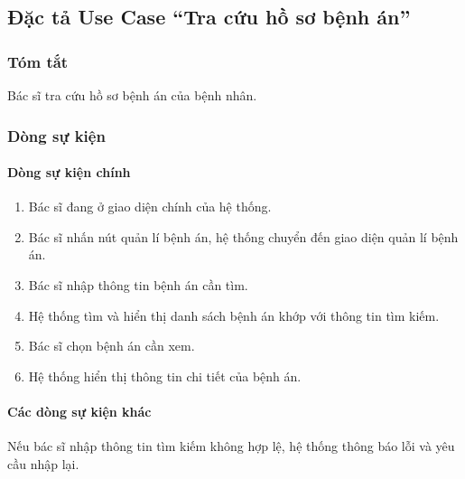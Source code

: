 \subsection{Đặc tả Use Case ``Tra cứu hồ sơ bệnh án''}

\subsubsection{Tóm tắt}
Bác sĩ tra cứu hồ sơ bệnh án của bệnh nhân.

\subsubsection{Dòng sự kiện}
\paragraph{\textbf{Dòng sự kiện chính}}
\begin{enumerate}
  \item Bác sĩ đang ở giao diện chính của hệ thống.
  \item Bác sĩ nhấn nút quản lí bệnh án, hệ thống chuyển đến giao diện quản lí bệnh án.
  \item Bác sĩ nhập thông tin bệnh án cần tìm.
  \item Hệ thống tìm và hiển thị danh sách bệnh án khớp với thông tin tìm kiếm.
  \item Bác sĩ chọn bệnh án cần xem.
  \item Hệ thống hiển thị thông tin chi tiết của bệnh án.
\end{enumerate}

\paragraph{\textbf{Các dòng sự kiện khác}}
Nếu bác sĩ nhập thông tin tìm kiếm không hợp lệ, hệ thống thông báo lỗi và yêu cầu nhập lại.

